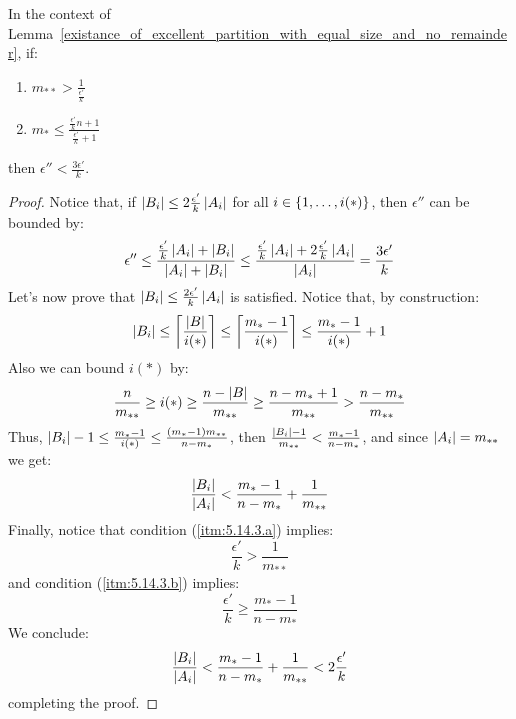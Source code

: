    \begin{remark}[Remark 5.14.3]\label{epsilons_proportion_can_be_k}
        In the context of Lemma~\ref{existance_of_excellent_partition_with_equal_size_and_no_remainder}, if:
        \begin{enumerate}[label=(\alph*), ref=\alph*]
            \item \label{itm:5.14.3.a} $m_{**} > \frac{1}{\frac{\epsilon'}{k}}$
            \item \label{itm:5.14.3.b} $m_* \leq \frac{\frac{\epsilon'}{k} n + 1}{\frac{\epsilon'}{k} + 1}$
        \end{enumerate}
        then $\epsilon'' < \frac{3 \epsilon'}{k}$.
        \begin{proof}
            Notice that, if $\left| B_i \right| \leq 2 \frac{\epsilon'}{k} \left| A_i \right|$ for all $i \in \left\{ 1, \dots, i(*) \right\}$,
            then $\epsilon''$ can be bounded by:
            $$
                \epsilon'' \leq \frac{\frac{\epsilon'}{k} \left| A_i \right| + \left| B_i \right|}{\left| A_i \right| + \left| B_i \right|}
                \leq \frac{\frac{\epsilon'}{k} \left| A_i \right| + 2 \frac{\epsilon'}{k} \left| A_i \right|}{\left| A_i \right|}
                = \frac{3 \epsilon'}{k}
            $$
            Let's now prove that $\left| B_i \right| \leq \frac{2 \epsilon'}{k} \left| A_i \right|$ is satisfied.
            Notice that, by construction:
            $$
                \left| B_i \right| \leq \left\lceil \frac{\left| B \right|}{i(*)} \right\rceil \leq \left\lceil \frac{m_* - 1}{i(*)} \right\rceil \leq
                \frac{m_* - 1}{i(*)} + 1
            $$
            Also we can bound $i(*)$ by:
            $$
                \frac{n}{m_{**}} \geq i(*) \geq \frac{n - \left| B \right|}{m_{**}} \geq \frac{n - m_* + 1}{m_{**}} >
                \frac{n - m_*}{m_{**}}
            $$
            Thus, $\left| B_i \right| - 1 \leq \frac{m_* - 1}{i(*)} \leq \frac{\left( m_* - 1 \right) m_{**}}{n - m_*}$,
            then $\frac{\left| B_i \right| - 1}{m_{**}} < \frac{m_* - 1}{n - m_*}$, and since $\left| A_i \right| = m_{**}$
            we get:
            $$
                \frac{\left| B_i \right|}{\left| A_i \right|} < \frac{m_* - 1}{n - m_*} + \frac{1}{m_{**}}
            $$
            Finally, notice that condition (\ref{itm:5.14.3.a}) implies:
            $$
                \frac{\epsilon'}{k} > \frac{1}{m_{**}}
            $$
            and condition (\ref{itm:5.14.3.b}) implies:
            $$
                \frac{\epsilon'}{k} \geq \frac{m_* - 1}{n - m_*}
            $$
            We conclude:
            $$
                \frac{\left| B_i \right|}{\left| A_i \right|} < \frac{m_* - 1}{n - m_*} + \frac{1}{m_{**}} < 2 \frac{\epsilon'}{k}
            $$
            completing the proof.
        \end{proof}
    \end{remark}

